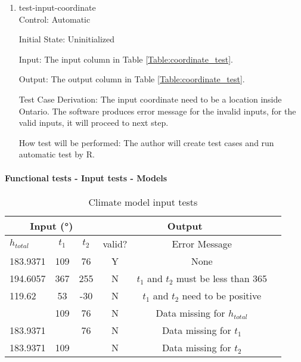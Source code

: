 \documentclass[12pt, titlepage]{article}
\begin{document}
\begin{enumerate}

\item{test-input-coordinate\\}
Control: Automatic
					
Initial State: Uninitialized
					
Input: The input column in Table \ref{Table:coordinate_test}.
					
Output: The output column in Table \ref{Table:coordinate_test}. 

Test Case Derivation: The input coordinate need to be a location inside Ontario. The software produces error message for the invalid inputs, for the valid inputs, it will proceed to next step. 
					
How test will be performed: The author will create test cases and run automatic test by R.
\end{enumerate}

\paragraph{Functional tests - Input tests - Models}

\begin{center}
\begin{table}[h]
\resizebox{\textwidth}{!}
{ %
    \begin{tabular}{ lccccc }
    \hline
      \multicolumn{3}{c|}{Input (\si[per-mode=symbol] {\degree}) }                            & \multicolumn{2}{c}{Output} \\ \hline
        $h_{total}$   &   $t_1$   & $t_2$  &   valid?   &   Error Message \\ \hline
    
       183.9371  & 109 & 76 &  Y  & None   \\    \hline
       194.6057  & 367 & 255 &  N  &  $t_1$ and $t_2$ must be less than 365  \\    \hline
       119.62  & 53 & -30 &  N  & $t_1$ and $t_2$ need to be positive                 \\    \hline  
         & 109 & 76 &  N  & Data missing for $h_{total}$                \\    \hline  
       183.9371  &  & 76 &   N  & Data missing for  $t_1$                    \\    \hline
       183.9371  & 109 &  &  N  & Data missing for  $t_2$                       \\    \hline
    \end{tabular} %
}
\caption{Climate model input tests}
\label{Table:climate_test}
\end{table}
\end{center}
\end{document}
